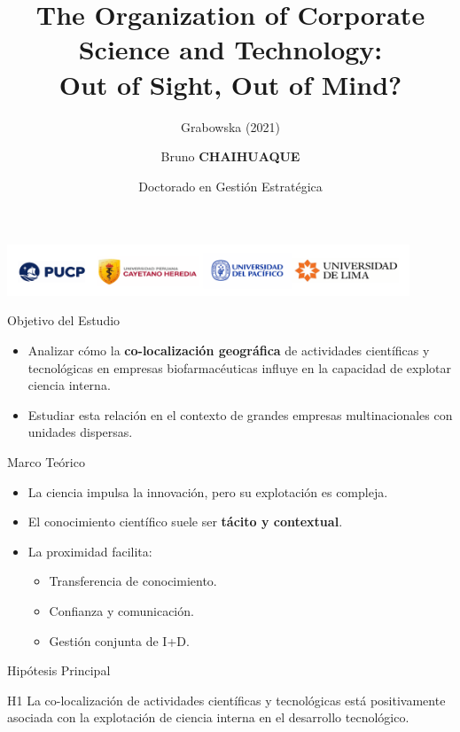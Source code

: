 \documentclass{beamer}
\title[Co-localización Ciencia y Tecnología]{The Organization of Corporate Science and Technology:\\ Out of Sight, Out of Mind?}
\subtitle{Grabowska (2021)}
\author{Bruno \textbf{CHAIHUAQUE}}
\date{Doctorado en Gestión Estratégica}
\begin{document}
	
	\begin{frame}
		\centering
		\titlepage
		\vspace{1cm}
		\includegraphics[width=0.9\textwidth]{./figs/Logos.pdf}
	\end{frame}
	
	\begin{frame}{Objetivo del Estudio}
		\begin{itemize}
			\item Analizar cómo la \textbf{co-localización geográfica} de actividades científicas y tecnológicas en empresas biofarmacéuticas influye en la capacidad de explotar ciencia interna.
			\item Estudiar esta relación en el contexto de grandes empresas multinacionales con unidades dispersas.
		\end{itemize}
	\end{frame}
	
	\begin{frame}{Marco Teórico}
		\begin{itemize}
			\item La ciencia impulsa la innovación, pero su explotación es compleja.
			\item El conocimiento científico suele ser \textbf{tácito y contextual}.
			\item La proximidad facilita:
			\begin{itemize}
				\item Transferencia de conocimiento.
				\item Confianza y comunicación.
				\item Gestión conjunta de I+D.
			\end{itemize}
		\end{itemize}
	\end{frame}
	
	\begin{frame}{Hipótesis Principal}
		\begin{block}{H1}
			La co-localización de actividades científicas y tecnológicas está positivamente asociada con la explotación de ciencia interna en el desarrollo tecnológico.
		\end{block}
	\end{frame}
	
\end{document}
